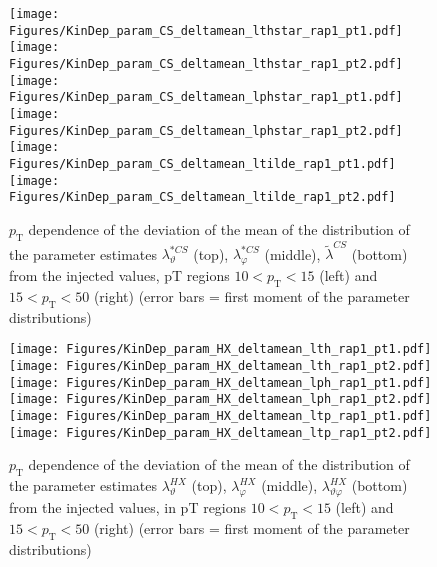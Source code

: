 \documentclass[12pt]{article}
\newcommand{\pT}{p_\mathrm{T}}
\newcommand{\lamtildeCS}{\tilde{\lambda}^{\scriptscriptstyle CS}}
\newcommand{\lamthstarCS}{\lambda^{* \scriptscriptstyle CS}_\vartheta}
\newcommand{\lamphstarCS}{\lambda^{* \scriptscriptstyle CS}_\varphi}
\newcommand{\lamthHX}{\lambda^{\scriptscriptstyle HX}_\vartheta}
\newcommand{\lamphHX}{\lambda^{\scriptscriptstyle HX}_\varphi}
\newcommand{\lamthphHX}{\lambda^{\scriptscriptstyle HX}_{\vartheta \varphi}}
\begin{document}
\begin{figure}[htbp]
\centering
\texttt{[image: Figures/KinDep\_param\_CS\_deltamean\_lthstar\_rap1\_pt1.pdf]}
\texttt{[image: Figures/KinDep\_param\_CS\_deltamean\_lthstar\_rap1\_pt2.pdf]}
\texttt{[image: Figures/KinDep\_param\_CS\_deltamean\_lphstar\_rap1\_pt1.pdf]}
\texttt{[image: Figures/KinDep\_param\_CS\_deltamean\_lphstar\_rap1\_pt2.pdf]}
\texttt{[image: Figures/KinDep\_param\_CS\_deltamean\_ltilde\_rap1\_pt1.pdf]}
\texttt{[image: Figures/KinDep\_param\_CS\_deltamean\_ltilde\_rap1\_pt2.pdf]}
\caption{$\pT$ dependence of the deviation of the mean of the distribution of
the parameter estimates $\lamthstarCS$ (top), $\lamphstarCS$ (middle),
$\lamtildeCS$ (bottom) from the injected values, pT regions $10<\pT<15$ (left) and $15<\pT<50$ (right) (error bars = first moment of
the parameter distributions)}
\end{figure}
\clearpage









\begin{figure}[htbp]
\centering
\texttt{[image: Figures/KinDep\_param\_HX\_deltamean\_lth\_rap1\_pt1.pdf]}
\texttt{[image: Figures/KinDep\_param\_HX\_deltamean\_lth\_rap1\_pt2.pdf]}
\texttt{[image: Figures/KinDep\_param\_HX\_deltamean\_lph\_rap1\_pt1.pdf]}
\texttt{[image: Figures/KinDep\_param\_HX\_deltamean\_lph\_rap1\_pt2.pdf]}
\texttt{[image: Figures/KinDep\_param\_HX\_deltamean\_ltp\_rap1\_pt1.pdf]}
\texttt{[image: Figures/KinDep\_param\_HX\_deltamean\_ltp\_rap1\_pt2.pdf]}
\caption{$\pT$ dependence of the deviation of the mean of the distribution of
the parameter estimates $\lamthHX$ (top), $\lamphHX$ (middle), $\lamthphHX$
(bottom) from the injected values, in pT regions $10<\pT<15$ (left) and $15<\pT<50$ (right) (error bars = first moment of the parameter
distributions)}
\end{figure}
\clearpage
\end{document}
